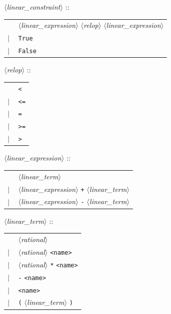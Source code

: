 \documentclass[a4paper,11pt]{report}
\newcommand{\nt}[1]{$\langle$\emph{#1}$\rangle$}
\newcommand{\regleGrammaire}[1]{\bigskip \noindent \nt{#1} :: \\}
\newcommand{\styleIMI}[1]{\textcolor{imicolor}{\texttt{#1}}}
\begin{document}
\regleGrammaire{linear\_constraint}
\begin{tabular}{l l}
	\  & \nt{linear\_expression} \nt{relop} \nt{linear\_expression} \\
	$|$ & \styleIMI{True} \\
	$|$ & \styleIMI{False} \\
\end{tabular}

\regleGrammaire{relop}
\begin{tabular}{l l}
	\  & \styleIMI{<} \\
	$|$ & \styleIMI{<=} \\
	$|$ & \styleIMI{=} \\
	$|$ & \styleIMI{>=} \\
	$|$ & \styleIMI{>} \\
\end{tabular}

\regleGrammaire{linear\_expression}
\begin{tabular}{l l}
	\  & \nt{linear\_term} \\
	$|$ & \nt{linear\_expression} \styleIMI{+} \nt{linear\_term} \\
	$|$ & \nt{linear\_expression} \styleIMI{-} \nt{linear\_term} \\
\end{tabular}

\regleGrammaire{linear\_term}
\begin{tabular}{l l}
	\  & \nt{rational} \\
	$|$ & \nt{rational} \styleIMI{<name>} \\
	$|$ & \nt{rational} \styleIMI{*} \styleIMI{<name>} \\
	$|$ & \styleIMI{-} \styleIMI{<name>} \\
	$|$ & \styleIMI{<name>} \\
	$|$ & \styleIMI{(} \nt{linear\_term} \styleIMI{)} \\
\end{tabular}
\end{document}
